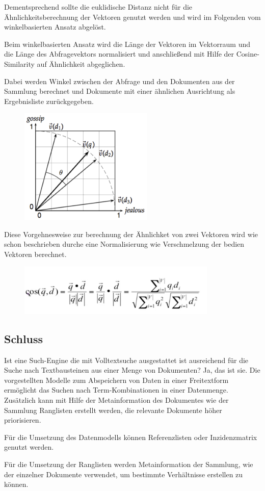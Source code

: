 Dementsprechend sollte die euklidische Distanz nicht für die
Ähnlichkeitsberechnung der Vektoren genutzt werden und wird im
Folgenden vom winkelbasierten Ansatz abgelöst. 

Beim winkelbasierten Ansatz wird die Länge der Vektoren im Vektorraum
und die Länge des Abfragevektors normalisiert und anschließend mit
Hilfe der Cosine-Similarity auf Ähnlichkeit abgeglichen.

Dabei werden Winkel zwischen der Abfrage und den Dokumenten aus der
Sammlung berechnet und Dokumente mit einer ähnlichen Ausrichtung als
Ergebnisliste zurückgegeben.


\begin{figure}
\centering
\includegraphics[width=6.361cm,height=5.528cm]{bilder/SeminararbeitArkadij-img7.png}
\end{figure}


Diese Vorgehnesweise zur berechnung der Ähnlichket von zwei Vektoren
wird wie schon beschrieben durche eine Normalisierung wie Verschmelzung
der bedien Vektoren berechnet.



\begin{figure}
\centering
\includegraphics[width=9.465cm,height=2.466cm]{bilder/SeminararbeitArkadij-img8.png}
\end{figure}


\subsection[Schluss]{Schluss}

Ist eine Such-Engine die mit Volltextsuche ausgestattet ist ausreichend
für die Suche nach Textbausteinen aus einer Menge von Dokumenten? Ja,
das ist sie. Die vorgestellten Modelle zum Abspeichern von Daten in
einer Freitextform ermöglicht das Suchen nach Term-Kombinationen in
einer Datenmenge. Zusätzlich kann mit Hilfe der Metainformation des
Dokumentes wie der Sammlung Ranglisten erstellt werden, die relevante
Dokumente höher priorisieren. 

Für die Umsetzung des Datenmodells können Referenzlisten oder
Inzidenzmatrix genutzt werden. \ 

Für die Umsetzung der Ranglisten werden Metainformation der Sammlung,
wie der einzelner Dokumente verwendet, um bestimmte Verhältnisse
erstellen zu können.

